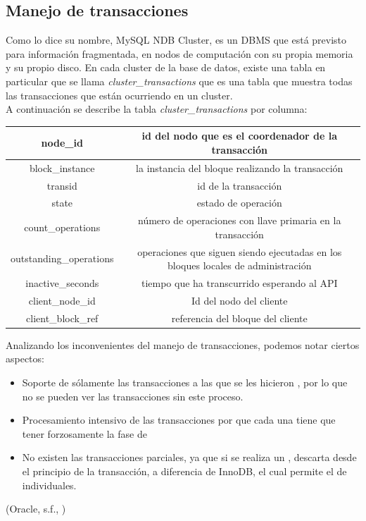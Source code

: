 \documentclass{acmart}
\begin{document}
\subsection{Manejo de transacciones}
Como lo dice su nombre, MySQL NDB Cluster, es un DBMS que está previsto para información fragmentada, en nodos de computación con su propia memoria y su propio disco.
En cada cluster de la base de datos, existe una tabla en particular que se llama \textit{cluster\_transactions} que es una tabla que muestra todas las transacciones que están ocurriendo en un cluster.\\
A continuación se describe la tabla \textit{cluster\_transactions} por columna:

\begin{center}
    \begin{tabular}{|c|c|}
        \hline
        node\_id & id del nodo que es el coordenador de la transacción \\
        \hline
        block\_instance & la instancia del bloque realizando la transacción \\
        \hline
        transid & id de la transacción \\
        \hline
        state & estado de operación\\
        \hline
        count\_operations & número de operaciones con llave primaria en la transacción \\
        \hline
        outstanding\_operations & operaciones que siguen siendo ejecutadas en los bloques locales de administración\\
        \hline
        inactive\_seconds & tiempo que ha transcurrido esperando al API \\
        \hline
        client\_node\_id & Id del nodo del cliente\\
        \hline
        client\_block\_ref & referencia del bloque del cliente\\
        \hline
    \end{tabular}
\end{center}

Analizando los inconvenientes del manejo de transacciones, podemos notar ciertos aspectos:
\begin{itemize}
    \item Soporte de sólamente las transacciones a las que se les hicieron , por lo que no se pueden ver las transacciones sin este proceso.
    \item Procesamiento intensivo de las transacciones por que cada una tiene que tener forzosamente la fase de 
    \item No existen las transacciones parciales, ya que si se realiza un , descarta desde el principio de la transacción, a diferencia de InnoDB, el cual permite el  de  individuales.
\end{itemize}
(Oracle, s.f., \cite{mysqllimittrans})
\end{document}
